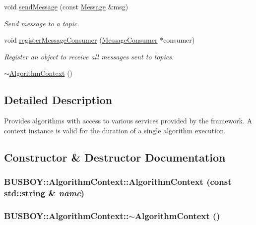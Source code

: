 \begin{DoxyCompactItemize}
void \hyperlink{classBUSBOY_1_1AlgorithmContext_a9874aa4a2bec24d137e5bf9d33ec8919}{sendMessage} (const \hyperlink{classBUSBOY_1_1Message}{Message} \&msg)
\begin{DoxyCompactList}\small\item\em Send message to a topic. \item\end{DoxyCompactList}\item 
void \hyperlink{classBUSBOY_1_1AlgorithmContext_ae2bdc8d592cbadcd8cf5b8f55244c804}{registerMessageConsumer} (\hyperlink{classBUSBOY_1_1MessageConsumer}{MessageConsumer} $\ast$consumer)
\begin{DoxyCompactList}\small\item\em Register an object to receive all messages sent to topics. \item\end{DoxyCompactList}\item 
\hyperlink{classBUSBOY_1_1AlgorithmContext_ae8d049caecb0efe1c46702e910401d5a}{$\sim$AlgorithmContext} ()
\end{DoxyCompactItemize}


\subsection{Detailed Description}
Provides algorithms with access to various services provided by the framework. A context instance is valid for the duration of a single algorithm execution. 

\subsection{Constructor \& Destructor Documentation}
\hypertarget{classBUSBOY_1_1AlgorithmContext_a9f280b865d71a0b4fb5c8070f79c1df4}{
\subsubsection[{AlgorithmContext}]{\setlength{\rightskip}{0pt plus 5cm}BUSBOY::AlgorithmContext::AlgorithmContext (const std::string \& {\em name})}}
\label{classBUSBOY_1_1AlgorithmContext_a9f280b865d71a0b4fb5c8070f79c1df4}
\hypertarget{classBUSBOY_1_1AlgorithmContext_ae8d049caecb0efe1c46702e910401d5a}{
\subsubsection[{$\sim$AlgorithmContext}]{\setlength{\rightskip}{0pt plus 5cm}BUSBOY::AlgorithmContext::$\sim$AlgorithmContext ()}}
\label{classBUSBOY_1_1AlgorithmContext_ae8d049caecb0efe1c46702e910401d5a}


